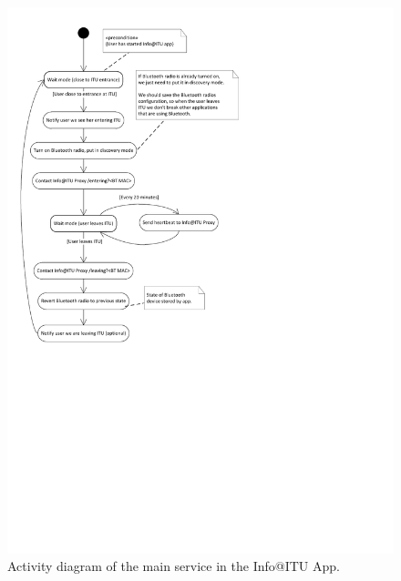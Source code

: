 \documentclass{ubicomp2011}
\begin{document}
\begin{figure}[t]
\begin{center}
\includegraphics[width=0.95\columnwidth]{android-app-activity-diagram.pdf}
\end{center}
\caption{Activity diagram of the main service in the Info@ITU App.}
\end{figure}




\end{document}
